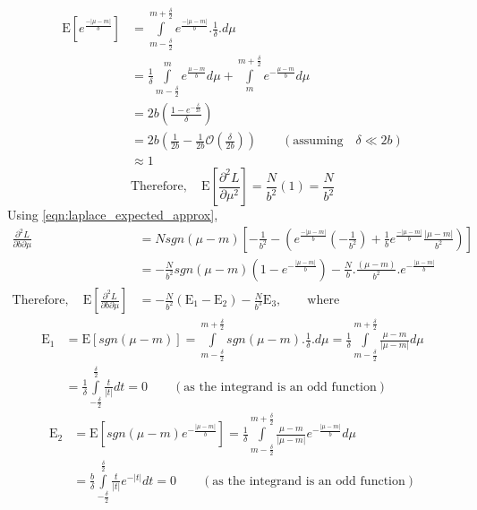 \documentclass[wcp]{jmlr}
\begin{document}
\begin{align*}
 \mathrm{E}\left[e^{\frac{-|\mu-m|}{b}}\right] &= \int\limits_{m-\frac{\delta}{2}}^{m+\frac{\delta}{2}} e^{\frac{-|\mu-m|}{b}} . \frac{1}{\delta} . d\mu \\
 &= \frac{1}{\delta} \int\limits_{m-\frac{\delta}{2}}^{m} e^{\frac{\mu-m}{b}} d\mu + \int\limits_{m}^{m+\frac{\delta}{2}}e^{-\frac{\mu-m}{b}} d\mu \\
 &= 2b \left(\frac{1-e^{-\frac{\delta}{2b}}}{\delta}\right) \\
 &= 2b \left( \frac{1}{2b} - \frac{1}{2b}\mathcal{O}\left(\frac{\delta}{2b}\right) \right) \quad\quad(\mathrm{assuming} \quad \delta \ll 2b) \\
 &\approx 1
 \end{align*}
\begin{equation}
 \mathrm{Therefore,}\quad \mathrm{E} \left[\frac{\partial^2 L}{\partial \mu^2}\right] = \frac{N}{b^2} (1) = \frac{N}{b^2} \label{eqn:fisher_11}
\end{equation}
Using \eqref{eqn:laplace_expected_approx}, 
\begin{align*}
 \frac{\partial^2 L}{\partial b \partial \mu} &= N sgn(\mu-m) \left[ -\frac{1}{b^2} - \left( e^{\frac{-|\mu-m|}{b}} \left( -\frac{1}{b^2} \right) + \frac{1}{b} e^{\frac{-|\mu-m|}{b}} \frac{|\mu-m|}{b^2} \right) \right] \\
 &= -\frac{N}{b^2} sgn(\mu-m)(1-e^{-\frac{|\mu-m|}{b}}) - \frac{N}{b} . \frac{(\mu-m)}{b^2} . e^{-\frac{|\mu-m|}{b}} \\
 \mathrm{Therefore,}\quad \mathrm{E} \left[\frac{\partial^2 L}{\partial b \partial \mu}\right] &= -\frac{N}{b^2} (\mathrm{E}_1 - \mathrm{E}_2) - \frac{N}{b^3} \mathrm{E}_3, \quad\quad\mathrm{where}
\end{align*}
\begin{align*}
 \mathrm{E}_1 &= \mathrm{E}[sgn(\mu-m)] = \int\limits_{m-\frac{\delta}{2}}^{m+\frac{\delta}{2}} sgn(\mu-m).\frac{1}{\delta}.d\mu = \frac{1}{\delta} \int\limits_{m-\frac{\delta}{2}}^{m+\frac{\delta}{2}} \frac{\mu-m}{|\mu-m|} d\mu \\
 &= \frac{1}{\delta} \int\limits_{-\frac{\delta}{2}}^{\frac{\delta}{2}} \frac{t}{|t|} dt = 0 \quad\quad(\mathrm{as\,\,the\,\,integrand\,\,is\,\,an\,\,odd\,\,function})
\end{align*}
\begin{align*}
 \mathrm{E}_2 &= \mathrm{E}[sgn(\mu-m)e^{-\frac{|\mu-m|}{b}}] = \frac{1}{\delta} \int\limits_{m-\frac{\delta}{2}}^{m+\frac{\delta}{2}} \frac{\mu-m}{|\mu-m|} e^{-\frac{|\mu-m|}{b}} d\mu \\
 &= \frac{b}{\delta} \int\limits_{-\frac{\delta}{2}}^{\frac{\delta}{2}} \frac{t}{|t|} e^{-|t|} dt = 0 \quad\quad(\mathrm{as\,\,the\,\,integrand\,\,is\,\,an\,\,odd\,\,function})
\end{align*}
\end{document}
